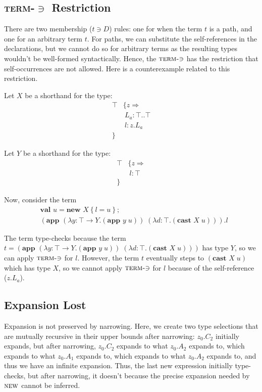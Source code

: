 \documentclass[9pt]{sigplanconf}
\newcommand{\tfun}{\rightarrow}
\newcommand{\mlrefine}[2]{\{#1 \Rightarrow #2 \}}
\newcommand{\ldefs}[1]{\left\{#1\right\}}
\newcommand{\abs}[3]{\lambda #1\!:\!#2.#3}
\newcommand{\mlnew}[3]{\textbf{val }#1 = \textbf{new }#2 ;\;\\&#3}
\newcommand{\Ldecl}[3]{#1 : #2..#3}%
\newcommand{\ldecl}[2]{#1 : #2}
\newcommand{\Top}{\top}%
\newcommand{\app}[2]{(\textbf{app }#1\;#2)}
\newcommand{\cast}[2]{(\textbf{cast }#1\;#2)}
\begin{document}
\subsection{\texorpdfstring{\textsc{term-$\ni$}}{Term-Mem} Restriction}\label{term_mem}

There are two membership ($t \ni D$) rules: one for when the term $t$
is a path, and one for an arbitrary term $t$. For paths, we can
substitute the self-references in the declarations, but we cannot do
so for arbitrary terms as the resulting types wouldn't be well-formed
syntactically. Hence, the $\textsc{term-$\ni$}$ has the restriction
that self-occurrences are not allowed. Here is a counterexample related
to this restriction.

Let $X$ be a shorthand for the type:
\begin{align*}
\Top & \mlrefine z {\\
&\ \Ldecl {L_a} \Top \Top\\
&\ \ldecl l {z.L_a}\\
}&
\end{align*}

Let $Y$ be a shorthand for the type:
\begin{align*}
\Top & \mlrefine z {\\
&\ \ldecl l \Top\\
}&
\end{align*}

Now, consider the term
\begin{align*}
&\mlnew u {X \ldefs{ l = u }}{
\app {(\abs y {\Top \tfun Y} {\app y u})} {(\abs d \Top {\cast X u})}.l
}
\end{align*}

The term type-checks because the term $t=\app {(\abs y {\Top \tfun Y}
  {\app y u})} {(\abs d \Top {\cast X u})}$ has type
$Y$, so we can apply $\textsc{term-$\ni$}$ for $l$. However, the term
$t$ eventually steps to ${\cast X u}$ which has type $X$,
so we cannot apply $\textsc{term-$\ni$}$ for $l$ because of the
self-reference ($z.L_a$).

\subsection{Expansion Lost}\label{narrowing_exp}

Expansion is not preserved by narrowing. Here, we create two type
selections that are mutually recursive in their upper bounds after
narrowing: $z_0.C_2$ initially expands, but after narrowing, $z_0.C_2$
expands to what $z_0.A_2$ expands to, which expands to what $z_0.A_1$
expands to, which expands to what $z_0.A_2$ expands to, and thus we
have an infinite expansion. Thus, the last new expression initially
type-checks, but after narrowing, it doesn't because the precise
expansion needed by $\textsc{new}$ cannot be inferred.
\end{document}
